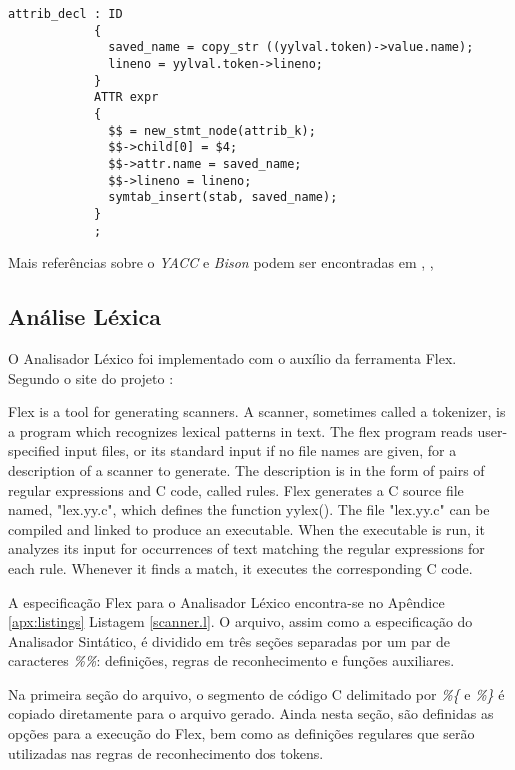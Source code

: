 \begin{lstlisting}[label=lst:grammar_attr_decl,caption=Instrução de Atribuição]
attrib_decl : ID
            {
              saved_name = copy_str ((yylval.token)->value.name);
              lineno = yylval.token->lineno;
            }
            ATTR expr
            {
              $$ = new_stmt_node(attrib_k);
              $$->child[0] = $4;
              $$->attr.name = saved_name;
              $$->lineno = lineno;
              symtab_insert(stab, saved_name);
            }
            ;
\end{lstlisting}

Mais referências sobre o \emph{YACC} e \emph{Bison} podem ser encontradas em
, , 

\subsection{Análise Léxica}
O Analisador Léxico foi implementado com o auxílio da ferramenta Flex. Segundo
o site do projeto \cite{flex-project}:

\begin{citacao}{4cm}{0cm}
  Flex is a tool for generating scanners. A scanner, sometimes called a
  tokenizer, is a program which recognizes lexical patterns in text. The flex
  program reads user-specified input files, or its standard input if no file
  names are given, for a description of a scanner to generate. The description
  is in the form of pairs of regular expressions and C code, called rules. Flex
  generates a C source file named, "lex.yy.c", which defines the function
  yylex(). The file "lex.yy.c" can be compiled and linked to produce an
  executable. When the executable is run, it analyzes its input for occurrences
  of text matching the regular expressions for each rule. Whenever it finds a
  match, it executes the corresponding C code.
\end{citacao}

A especificação Flex para o Analisador Léxico encontra-se no Apêndice
\ref{apx:listings} Listagem \ref{scanner.l}. O arquivo, assim como a
especificação do Analisador Sintático, é dividido em três seções separadas
por um par de caracteres \emph{\%\%}: definições, regras de reconhecimento e
funções auxiliares.

Na primeira seção do arquivo, o segmento de código C delimitado por
\emph{\%\{} e \emph{\%\}} é copiado diretamente para o arquivo gerado. Ainda
nesta seção, são definidas as opções para a execução do Flex, bem como as
definições regulares que serão utilizadas nas regras de reconhecimento dos
tokens.

